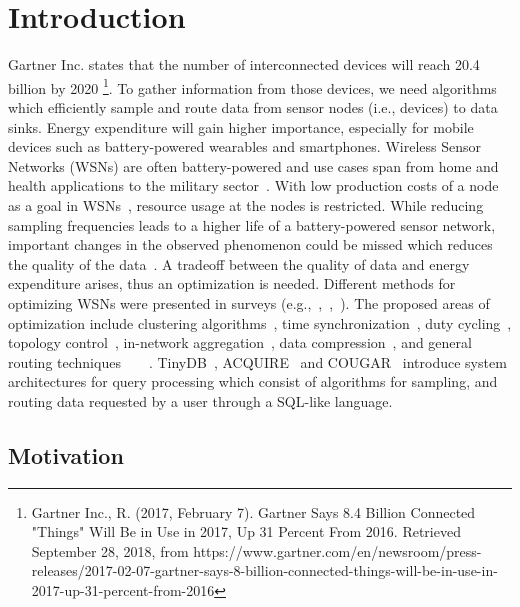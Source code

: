 \section{Introduction}
\label{sec:Introduction}
Gartner Inc. states that the number of interconnected devices will reach 20.4 billion by 2020 \footnote{Gartner Inc., R. (2017, February 7). Gartner Says 8.4 Billion Connected "Things" Will Be in Use in 2017, Up 31 Percent From 2016. Retrieved September 28, 2018, from https://www.gartner.com/en/newsroom/press-releases/2017-02-07-gartner-says-8-billion-connected-things-will-be-in-use-in-2017-up-31-percent-from-2016}.
To gather information from those devices, we need algorithms which efficiently sample and route data from sensor nodes (i.e., devices) to data sinks. Energy expenditure will gain higher importance, especially for mobile devices such as battery-powered wearables and smartphones. Wireless Sensor Networks (WSNs) are often battery-powered and use cases span from home and health applications to the military sector~\cite{akyildiz2002wireless}. With low production costs of a node as a goal in WSNs~\cite{akyildiz2002wireless}, resource usage at the nodes is restricted. While reducing sampling frequencies leads to a higher life of a battery-powered sensor network, important changes in the observed phenomenon could be missed which reduces the quality of the data~\cite{akyildiz2002wireless}. A tradeoff between the quality of data and energy expenditure arises, thus an optimization is needed. Different methods for optimizing WSNs were presented in surveys (e.g.,~\cite{abbasi2007survey},~\cite{sivrikaya2004time},~\cite{carrano2014survey}). The proposed areas of optimization include clustering algorithms~\cite{abbasi2007survey}, time synchronization~\cite{sivrikaya2004time}, duty cycling~\cite{carrano2014survey}, topology control~\cite{li2013survey}, in-network aggregation~\cite{fasolo2007network}, data compression~\cite{srisooksai2012practical}, and general routing techniques~\cite{al2004routing}~\cite{kulkarni2011particle}~\cite{singh2015survey}~\cite{rault2014energy}. TinyDB~\cite{madden2005tinydb}, ACQUIRE~\cite{sadagopan2003acquire} and COUGAR~\cite{yao2002cougar} introduce system architectures for query processing which consist of algorithms for sampling, and routing data requested by a user through a SQL-like language.




\subsection{Motivation}
\label{sec:motivation}

